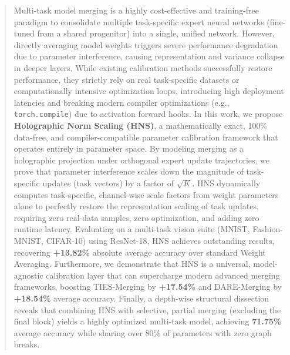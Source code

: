 \documentclass{article}
\theoremstyle{plain}
\theoremstyle{definition}
\theoremstyle{remark}
\begin{document}

\printAffiliationsAndNotice{}

\makeatletter
\gdef\@icmltitlerunning{Holographic Norm Scaling for Model Merging}
\makeatother

\begin{abstract}
  Multi-task model merging is a highly cost-effective and training-free paradigm to consolidate multiple task-specific expert neural networks (fine-tuned from a shared progenitor) into a single, unified network. However, directly averaging model weights triggers severe performance degradation due to parameter interference, causing representation and variance collapse in deeper layers. While existing calibration methods successfully restore performance, they strictly rely on real task-specific datasets or computationally intensive optimization loops, introducing high deployment latencies and breaking modern compiler optimizations (e.g., \texttt{torch.compile}) due to activation forward hooks. In this work, we propose \textbf{Holographic Norm Scaling (HNS)}, a mathematically exact, 100\% data-free, and compiler-compatible parameter calibration framework that operates entirely in parameter space. By modeling merging as a holographic projection under orthogonal expert update trajectories, we prove that parameter interference scales down the magnitude of task-specific updates (task vectors) by a factor of $\sqrt{K}$. HNS dynamically computes task-specific, channel-wise scale factors from weight parameters alone to perfectly restore the representation scaling of task updates, requiring zero real-data samples, zero optimization, and adding zero runtime latency. Evaluating on a multi-task vision suite (MNIST, Fashion-MNIST, CIFAR-10) using ResNet-18, HNS achieves outstanding results, recovering \textbf{+13.82\%} absolute average accuracy over standard Weight Averaging. Furthermore, we demonstrate that HNS is a universal, model-agnostic calibration layer that can supercharge modern advanced merging frameworks, boosting TIES-Merging by \textbf{+17.54\%} and DARE-Merging by \textbf{+18.54\%} average accuracy. Finally, a depth-wise structural dissection reveals that combining HNS with selective, partial merging (excluding the final block) yields a highly optimized multi-task model, achieving \textbf{71.75\%} average accuracy while sharing over 80\% of parameters with zero graph breaks.
\end{abstract}
\end{document}
